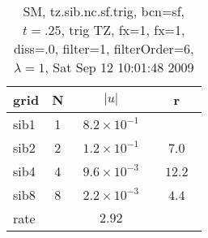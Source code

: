 \begin{table}[hbt]\tableFont %
\begin{center}
\begin{tabular}{|l|c|c|c|} \hline 
grid  & N &  $\vert u \vert$   & r \\ \hline 
                sib1 &     1 & ~$8.2\times10^{ -1}$~ &            \\ \hline
                sib2 &     2 & ~$1.2\times10^{ -1}$~ & ~$  7.0$~  \\ \hline
                sib4 &     4 & ~$9.6\times10^{ -3}$~ & ~$ 12.2$~  \\ \hline
                sib8 &     8 & ~$2.2\times10^{ -3}$~ & ~$  4.4$~  \\ \hline
    rate             &       &       $2.92$         &        \\ \hline
\end{tabular}
\caption{SM, tz.sib.nc.sf.trig, bcn=sf, $t=.25$, trig TZ, fx=1, fx=1, diss=.0, filter=1, filterOrder=6, $\lambda=1$, Sat Sep 12 10:01:48 2009}\label{table:tz.sib.nc.sf.trig}
\end{center}
\end{table}
